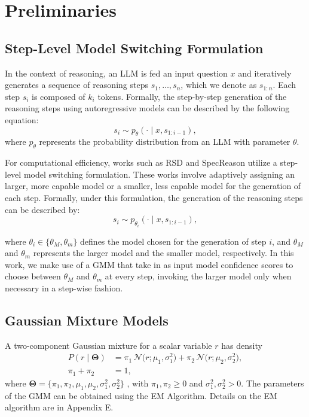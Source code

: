 \documentclass[letterpaper]{article} %
\newcommand{\N}[3]{\mathcal{N}\!\bigl(#1;#2,#3\bigr)}   %
\begin{document}
\section{Preliminaries}
\subsection{Step-Level Model Switching Formulation}
In the context of reasoning, an LLM is fed an input question $x$ and iteratively generates a sequence of reasoning steps $s_1, \ldots, s_n$, which we denote as $s_{1:n}$. Each step $s_i$ is composed of $k_i$ tokens. Formally, the step-by-step generation of the reasoning steps using autoregressive models can be described by the following equation:
\begin{equation}
    s_i \sim p_\theta(\cdot \mid x, s_{1:i-1}),
\end{equation}
\noindent where $p_\theta$ represents the probability distribution from an LLM with parameter $\theta$.

For computational efficiency, works such as RSD \citep{liaoreward} and SpecReason \citep{pan2025specreason} utilize a step-level model switching formulation. These works involve adaptively assigning an larger, more capable model or a smaller, less capable model for the generation of each step. Formally, under this formulation, the generation of the reasoning steps can be described by:
\begin{equation}
    s_i \sim p_{\theta_i}(\cdot \mid x, s_{1:i-1}),
\end{equation}

\noindent where $\theta_i\in \{\theta_M, \theta_m\}$ defines the model chosen for the generation of step $i$, and $\theta_M$ and $\theta_m$ represents the larger model and the smaller model, respectively. In this work, we make use of a GMM that take in as input model confidence scores to choose between $\theta_M$ and $\theta_m$ at every step, invoking the larger model only when necessary in a step-wise fashion.


\subsection{Gaussian Mixture Models}

A two-component Gaussian mixture for a scalar variable \(r\) has density
\begin{equation}
\begin{aligned}
P(r \mid \boldsymbol{\Theta})
  &= \pi_{1}\,\N{r}{\mu_{1}}{\sigma_{1}^{2}}
     + \pi_{2}\,\N{r}{\mu_{2}}{\sigma_{2}^{2}},\\[4pt]
\pi_{1} + \pi_{2} &= 1,
\end{aligned}\label{eq:gmm}
\end{equation}
where \(\boldsymbol{\Theta}=
\{\pi_{1},\pi_{2},\mu_{1},\mu_{2},\sigma_{1}^{2},\sigma_{2}^{2}\}\)
, with \(\pi_{1}, \pi_2 \ge 0\) and \(\sigma_{1}^{2}, \sigma_{2}^{2}>0\). The parameters of the GMM can be obtained using the EM Algorithm. Details on the EM algorithm are in Appendix E.
\end{document}
